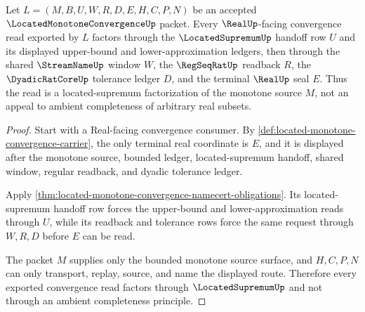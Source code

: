 \begin{theorem}
\label{thm:located-monotone-convergence-supremum-readback}
Let $L=(M,B,U,W,R,D,E,H,C,P,N)$ be an accepted $\LocatedMonotoneConvergenceUp$ packet. Every $\RealUp$-facing convergence read exported by $L$ factors through the $\LocatedSupremumUp$ handoff row $U$ and its displayed upper-bound and lower-approximation ledgers, then through the shared $\StreamNameUp$ window $W$, the $\RegSeqRatUp$ readback $R$, the $\DyadicRatCoreUp$ tolerance ledger $D$, and the terminal $\RealUp$ seal $E$. Thus the read is a located-supremum factorization of the monotone source $M$, not an appeal to ambient completeness of arbitrary real subsets.
\end{theorem}
\begin{proof}
Start with a Real-facing convergence consumer. By \autoref{def:located-monotone-convergence-carrier}, the only terminal real coordinate is $E$, and it is displayed after the monotone source, bounded ledger, located-supremum handoff, shared window, regular readback, and dyadic tolerance ledger.

Apply \autoref{thm:located-monotone-convergence-namecert-obligations}. Its located-supremum handoff row forces the upper-bound and lower-approximation reads through $U$, while its readback and tolerance rows force the same request through $W,R,D$ before $E$ can be read.

The packet $M$ supplies only the bounded monotone source surface, and $H,C,P,N$ can only transport, replay, source, and name the displayed route. Therefore every exported convergence read factors through $\LocatedSupremumUp$ and not through an ambient completeness principle.
\end{proof}

